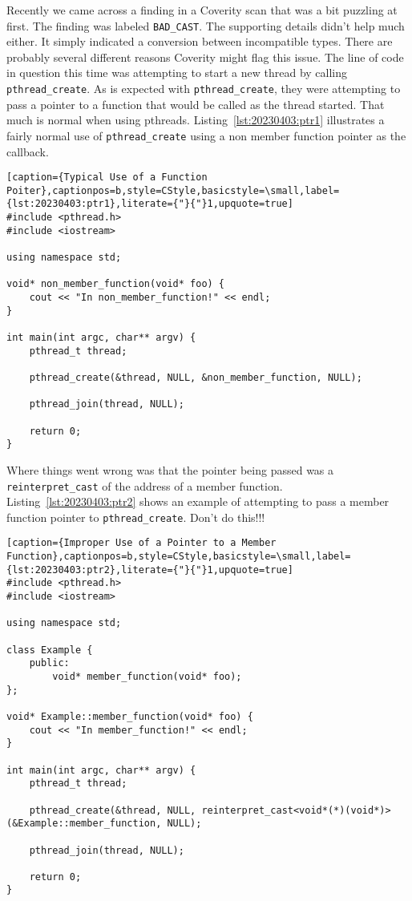 Recently we came across a finding in a Coverity scan that was a bit puzzling at first. The finding was labeled \texttt{BAD\_CAST}. The supporting details didn’t help much either. It simply indicated a conversion between incompatible types. There are probably several different reasons Coverity might flag this issue. The line of code in question this time was attempting to start a new thread by calling \texttt{pthread\_create}. As is expected with \texttt{pthread\_create}, they were attempting to pass a pointer to a function that would be called as the thread started. That much is normal when using pthreads. Listing~\ref{lst:20230403:ptr1} illustrates a fairly normal use of \texttt{pthread\_create} using a non member function pointer as the callback.

\begin{lstlisting}[caption={Typical Use of a Function Poiter},captionpos=b,style=CStyle,basicstyle=\small,label={lst:20230403:ptr1},literate={"}{"}1,upquote=true]
#include <pthread.h>
#include <iostream>

using namespace std;

void* non_member_function(void* foo) {
	cout << "In non_member_function!" << endl;
}

int main(int argc, char** argv) {
	pthread_t thread;

	pthread_create(&thread, NULL, &non_member_function, NULL);

	pthread_join(thread, NULL);

	return 0;
}
\end{lstlisting}

Where things went wrong was that the pointer being passed was a \texttt{reinterpret\_cast} of the address of a member function. Listing~\ref{lst:20230403:ptr2} shows an example of attempting to pass a member function pointer to \texttt{pthread\_create}. Don't do this!!!

\begin{lstlisting}[caption={Improper Use of a Pointer to a Member Function},captionpos=b,style=CStyle,basicstyle=\small,label={lst:20230403:ptr2},literate={"}{"}1,upquote=true]
#include <pthread.h>
#include <iostream>

using namespace std;

class Example {
	public:
		void* member_function(void* foo);
};

void* Example::member_function(void* foo) {
	cout << "In member_function!" << endl;
}

int main(int argc, char** argv) {
	pthread_t thread;

	pthread_create(&thread, NULL, reinterpret_cast<void*(*)(void*)>(&Example::member_function, NULL);

	pthread_join(thread, NULL);

	return 0;
}
\end{lstlisting}

